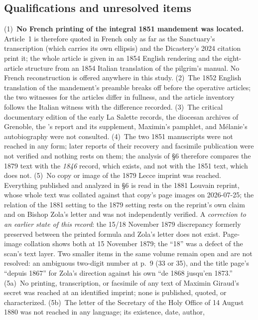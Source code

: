 \subsection*{Qualifications and unresolved items}

(1)~\textbf{No French printing of the integral 1851 mandement was
located.} Article~1 is therefore quoted in French only as far as the
Sanctuary's transcription (which carries its own ellipsis) and the
Dicastery's 2024 citation print it; the whole article is given in an
1854 English rendering and the eight-article structure from an 1854
Italian translation of the pilgrim's manual. No French reconstruction
is offered anywhere in this study. (2)~The 1852 English translation
of the mandement's preamble breaks off before the operative
articles; the two witnesses for the articles differ in fullness, and
the article inventory follows the Italian witness with the difference
recorded. (3)~The critical documentary edition of the early La
Salette records, the diocesan archives of Grenoble, the
's report and its supplement, Maximin's pamphlet,
and Mélanie's autobiography were not consulted. (4)~The two 1851
manuscripts were not reached in any form; later reports of their
recovery and facsimile publication were not verified and nothing
rests on them; the analysis of \S6 therefore compares the 1879 text
with the \emph{1846} record, which exists, and not with the 1851
text, which does not. (5)~No copy or image of the 1879 Lecce imprint
was reached. Everything published and analyzed in \S6 is read in the
1881 Louvain reprint, whose whole text was collated against that
copy's page images on 2026-07-25; the relation of the 1881 setting
to the 1879 setting rests on the reprint's own claim and on Bishop
Zola's letter and was not independently verified. A \emph{correction
to an earlier state of this record}: the 15\slash 18 November 1879
discrepancy formerly preserved between the printed formula and
Zola's letter does not exist. Page-image collation shows both at 15
November 1879; the ``18'' was a defect of the scan's text layer.
Two smaller items in the same volume remain open and are not
resolved: an ambiguous two-digit number at p.~9 (33 or 35), and the
title page's ``depuis 1867'' for Zola's direction against his own
``de 1868 jusqu'en 1873.'' (5a)~No printing, transcription, or
facsimile of any text of Maximin Giraud's secret was reached at an
identified imprint; none is published, quoted, or characterized.
(5b)~The letter of the Secretary of the Holy Office of 14 August
1880 was not reached in any language; its existence, date, author,
